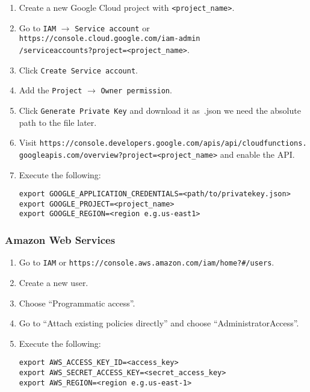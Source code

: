 \documentclass[../main.tex]{subfiles}
\begin{document}
\begin{enumerate}
\item Create a new Google Cloud project with \texttt{<project\_name>}.
\item Go to \texttt{IAM} $\rightarrow$ \texttt{Service account} or \texttt{https://console.cloud.google.com/iam-admin\\
  /serviceaccounts?project=<project\_name>}.
\item Click \texttt{Create Service account}.
\item Add the \texttt{Project} $\rightarrow$ \texttt{Owner permission}. %
\item Click \texttt{Generate Private Key} and download it as~.json we need the absolute path to the file later.
\item Visit \texttt{https://console.developers.google.com/apis/api/cloudfunctions.\\
  googleapis.com/overview?project=<project\_name>} and enable the API.\@
\item Execute the following: 
  \begin{tcolorbox}
    \texttt{export GOOGLE\_APPLICATION\_CREDENTIALS=<path/to/privatekey.json>}\\
    \texttt{export GOOGLE\_PROJECT=<project\_name>}\\
    \texttt{export GOOGLE\_REGION=<region e.g.\@ us-east1>}
  \end{tcolorbox}
\end{enumerate}

\subsubsection{Amazon Web Services}\label{sec:providersetupaws}
\begin{enumerate}
\item Go to \texttt{IAM} or \texttt{https://console.aws.amazon.com/iam/home?\#/users}.
\item Create a new user.
\item Choose ``Programmatic access''.
\item Go to ``Attach existing policies directly'' and choose ``AdministratorAccess''.
\item Execute the following: 
  \begin{tcolorbox}
    \texttt{export AWS\_ACCESS\_KEY\_ID=<access\_key>}\\
    \texttt{export AWS\_SECRET\_ACCESS\_KEY=<secret\_access\_key>}\\
    \texttt{export AWS\_REGION=<region e.g.\@ us-east-1>}
  \end{tcolorbox}
\end{enumerate}
\end{document}
